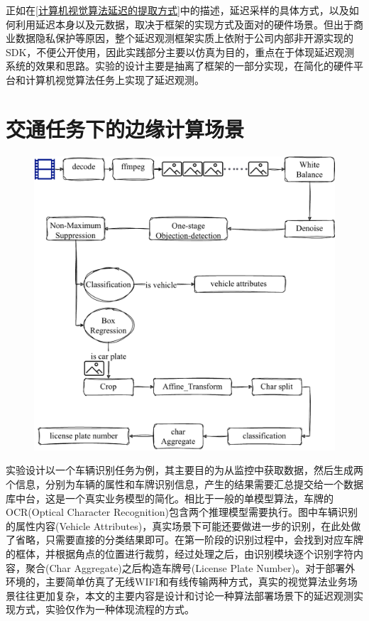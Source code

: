 \documentclass[master,anonymous]{shtthesis}
\begin{document}
正如在\ref{计算机视觉算法延迟的提取方式}中的描述，延迟采样的具体方式，以及如何利用延迟本身以及元数据，取决于框架的实现方式及面对的硬件场景。但出于商业数据隐私保护等原因，整个延迟观测框架实质上依附于公司内部非开源实现的SDK，不便公开使用，因此实践部分主要以仿真为目的，重点在于体现延迟观测系统的效果和思路。实验的设计主要是抽离了框架的一部分实现，在简化的硬件平台和计算机视觉算法任务上实现了延迟观测。

\section{交通任务下的边缘计算场景}
\begin{figure}[htbp]
	\centering
	\includegraphics[width=12cm]{img/exp.pdf}
	\label{简化的车牌识别流程}
\end{figure}
实验设计以一个车辆识别任务为例，其主要目的为从监控中获取数据，然后生成两个信息，分别为车辆的属性和车牌识别信息，产生的结果需要汇总提交给一个数据库中台，这是一个真实业务模型的简化。相比于一般的单模型算法，车牌的OCR(Optical Character Recognition)包含两个推理模型需要执行。图中车辆识别的属性内容(Vehicle Attributes)，真实场景下可能还要做进一步的识别，在此处做了省略，只需要直接的分类结果即可。在第一阶段的识别过程中，会找到对应车牌的框体，并根据角点的位置进行裁剪，经过处理之后，由识别模块逐个识别字符内容，聚合(Char Aggregate)之后构造车牌号(License Plate Number)。对于部署外环境的，主要简单仿真了无线WIFI和有线传输两种方式，真实的视觉算法业务场景往往更加复杂，本文的主要内容是设计和讨论一种算法部署场景下的延迟观测实现方式，实验仅作为一种体现流程的方式。
\end{document}
